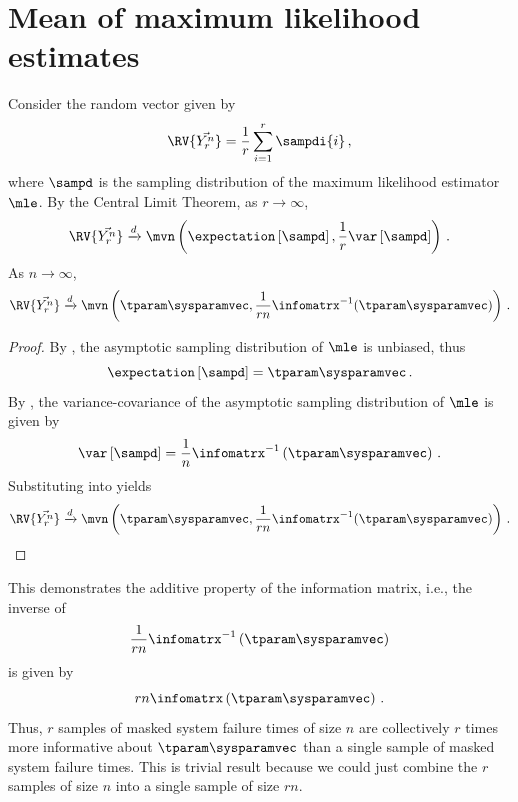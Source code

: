 \documentclass[../main.tex]{subfiles}
\begin{document}
\chapter{Mean of maximum likelihood estimates}
Consider the random vector given by
\begin{equation}
    \RV{\vec{Y_r^n}} = \frac{1}{r} \sum_{i=1}^{r} \sampdi{i}\,,
\end{equation}
where $\sampd$ is the sampling distribution of the maximum likelihood estimator $\mle$. By the Central Limit Theorem, as $r \to \infty$,
\begin{equation}
\label{eq:clt_y_rn}
    \RV{\vec{Y_r^n}} \xrightarrow{d} \mvn\left(\expectation\left[\sampd\right], \frac{1}{r} \var\left[\sampd\right]\right)\,.
\end{equation}
As $n \to \infty$,
\begin{equation}
    \RV{\vec{Y_r^n}} \xrightarrow{d} \mvn\left(\tparam\sysparamvec, \frac{1}{r n}\infomatrx^{-1}(\tparam\sysparamvec) \right)\,.
\end{equation}
\begin{proof}
By \Cref{}, the asymptotic sampling distribution of $\mle$ is unbiased, thus
\begin{equation}
\label{eq:proof_y_r_n_expect}
    \expectation\left[\sampd\right] = \tparam\sysparamvec\,.
\end{equation}
By \Cref{}, the variance-covariance of the asymptotic sampling distribution of $\mle$ is given by
\begin{equation}
\label{eq:proof_y_r_n_var}
    \var\left[\sampd\right] = \frac{1}{n} \infomatrx^{-1}\left(\tparam\sysparamvec\right)\,.
\end{equation}
Substituting  into  yields
\begin{equation}
    \RV{\vec{Y_r^n}} \xrightarrow{d} \mvn\left(\tparam\sysparamvec, \frac{1}{r n}\infomatrx^{-1}(\tparam\sysparamvec) \right)\,.
\end{equation}
\end{proof}
This demonstrates the additive property of the information matrix, i.e., the inverse of
\begin{equation}
    \frac{1}{r n} \infomatrx^{-1}\left(\tparam\sysparamvec\right)
\end{equation}
is given by
\begin{equation}
    r n \infomatrx\left(\tparam\sysparamvec\right)\,.
\end{equation}
Thus, $r$ samples of masked system failure times of size $n$ are collectively $r$ times more informative about $\tparam\sysparamvec$ than a single sample of masked system failure times. This is trivial result because we could just combine the $r$ samples of size $n$ into a single sample of size $r n$.
\end{document}
